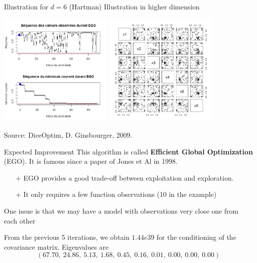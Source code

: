 \begin{frame}{}

\begin{exampleblock}{Illustration for $d=6$ (Hartman)}
	Illustration in higher dimension
\begin{center}
\includegraphics[height=5.5cm]{4_optimization/figures/egoHartman} \includegraphics[height=5.5cm]{4_optimization/figures/egoHartman2}
\end{center}
\small Source: DiceOptim, D. Ginsbourger, 2009.
\end{exampleblock}
\end{frame}

\begin{frame}{Expected Improvement}
This algorithm is called \textbf{Efficient Global Optimization} (EGO). It is famous since a paper of Jones et Al in 1998.\\
\vspace{5mm}
\begin{itemize}
	\item[+] EGO provides a good trade-off between exploitation and exploration.
	\item[+] It only requires a few function observations (10 in the example)
\end{itemize}
One issue is that we may have a model with observations very close one from each other\\
\begin{example}
From the previous 5 iterations, we obtain $1.44e39$ for the conditioning of the covariance matrix. Eigenvalues are
$$ (67.70,\  24.86,\  5.13,\  1.68,\  0.45,\  0.16,\  0.01,\  0.00,\  0.00,\ 0.00) $$
\end{example}
\end{frame}

